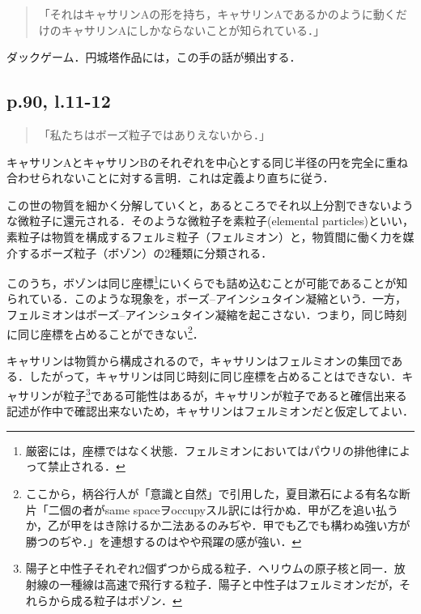 \documentclass[10pt, a5paper, twoside]{ltjsarticle}
\newcommand{\hyphen}{\insertkanjiskip--\insertkanjiskip}
\begin{document}
            \begin{quote}
                「それはキャサリンAの形を持ち，キャサリンAであるかのように動くだけのキャサリンAにしかならないことが知られている．」
            \end{quote}

            ダックゲーム．円城塔作品には，この手の話が頻出する．

        \subsection{p.90, l.11-12}

            \begin{quote}
                「私たちはボーズ粒子ではありえないから．」
            \end{quote}

            キャサリンAとキャサリンBのそれぞれを中心とする同じ半径の円を完全に重ね合わせられないことに対する言明．これは定義より直ちに従う．

            この世の物質を細かく分解していくと，あるところでそれ以上分割できないような微粒子に還元される．そのような微粒子を素粒子(elemental particles)といい，素粒子は物質を構成するフェルミ粒子（フェルミオン）と，物質間に働く力を媒介するボーズ粒子（ボゾン）の2種類に分類される．

            このうち，ボゾンは同じ座標\footnote{厳密には，座標ではなく状態．フェルミオンにおいてはパウリの排他律によって禁止される．}にいくらでも詰め込むことが可能であることが知られている．このような現象を，ボーズ\hyphen アインシュタイン凝縮という．一方，フェルミオンはボーズ\hyphen アインシュタイン凝縮を起こさない．つまり，同じ時刻に同じ座標を占めることができない\footnote{ここから，柄谷行人が「意識と自然」\cite{krtn}で引用した，夏目漱石による有名な断片「二個の者がsame spaceヲoccupyスル訳には行かぬ．甲が乙を追い払うか，乙が甲をはき除けるか二法あるのみぢや．甲でも乙でも構わぬ強い方が勝つのぢや．」\cite{soseki}を連想するのはやや飛躍の感が強い．}．

            キャサリンは物質から構成されるので，キャサリンはフェルミオンの集団である．したがって，キャサリンは同じ時刻に同じ座標を占めることはできない．キャサリンが\alpha 粒子\footnote{陽子と中性子それぞれ2個ずつから成る粒子．ヘリウムの原子核と同一．放射線の一種\alpha 線は高速で飛行する\alpha 粒子．陽子と中性子はフェルミオンだが，それらから成る\alpha 粒子はボゾン．}である可能性はあるが，キャサリンが\alpha 粒子であると確信出来る記述が作中で確認出来ないため，キャサリンはフェルミオンだと仮定してよい．
\end{document}
